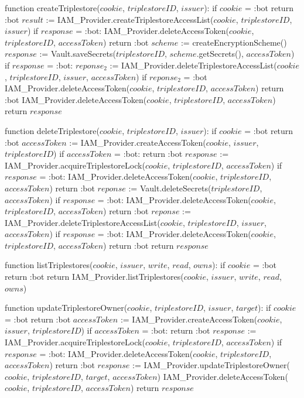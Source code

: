 function createTriplestore($cookie$, $triplestoreID$, $issuer$):
    if $cookie$ = :bot
        return :bot
    $result$ := IAM_Provider.createTriplestoreAccessList($cookie$, $triplestoreID$, $issuer$)
    if $response$ = :bot: 
        IAM_Provider.deleteAccessToken($cookie$, $triplestoreID$, $accessToken$)
        return :bot
    $scheme$ := createEncryptionScheme() 
    $response$ := Vault.saveSecrets($triplestoreID$, $scheme$.getSecrets(), $accessToken$)
    if $response$ = :bot:
        $reponse_2$ := IAM_Provider.deleteTriplestoreAccessList($cookie$, $triplestoreID$, $issuer$, $accessToken$)
        if $reponse_2$ = :bot
            IAM_Provider.deleteAccessToken($cookie$, $triplestoreID$, $accessToken$)
        return :bot
    IAM_Provider.deleteAccessToken($cookie$, $triplestoreID$, $accessToken$)
    return $response$

function deleteTriplestore($cookie$, $triplestoreID$, $issuer$):
    if $cookie$ = :bot
        return :bot
    $accessToken$ := IAM_Provider.createAccessToken($cookie$, $issuer$, $triplestoreID$)
    if $accessToken$ = :bot:
        return :bot
    $response$ := IAM_Provider.acquireTriplestoreLock($cookie$, $triplestoreID$, $accessToken$)
    if $response$ = :bot: 
        IAM_Provider.deleteAccessToken($cookie$, $triplestoreID$, $accessToken$)
        return :bot
    $reponse$ := Vault.deleteSecrets($triplestoreID$, $accessToken$)
    if $response$ = :bot: 
        IAM_Provider.deleteAccessToken($cookie$, $triplestoreID$, $accessToken$)
        return :bot
    $reponse$ := IAM_Provider.deleteTriplestoreAccessList($cookie$, $triplestoreID$, $issuer$, $accessToken$)
    if $response$ = :bot: 
        IAM_Provider.deleteAccessToken($cookie$, $triplestoreID$, $accessToken$)
        return :bot
    return $response$

function listTriplestores($cookie$, $issuer$, $write$, $read$, $owns$):
    if $cookie$ = :bot
        return :bot
    return IAM_Provider.listTriplestores($cookie$, $issuer$, $write$, $read$, $owns$)

function updateTriplestoreOwner($cookie$, $triplestoreID$, $issuer$, $target$):
    if $cookie$ = :bot
        return :bot
    $accessToken$ := IAM_Provider.createAccessToken($cookie$, $issuer$, $triplestoreID$)
    if $accessToken$ = :bot:
        return :bot
    $response$ := IAM_Provider.acquireTriplestoreLock($cookie$, $triplestoreID$, $accessToken$)
    if $response$ = :bot: 
        IAM_Provider.deleteAccessToken($cookie$, $triplestoreID$, $accessToken$)
        return :bot
    $response$ := IAM_Provider.updateTriplestoreOwner($cookie$, $triplestoreID$, $target$, $accessToken$)
    IAM_Provider.deleteAccessToken($cookie$, $triplestoreID$, $accessToken$)
    return $response$

